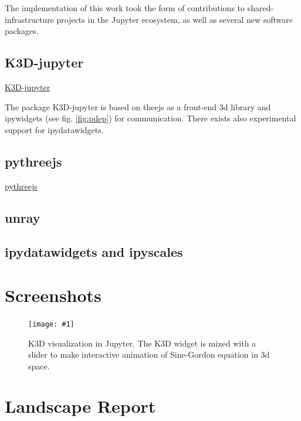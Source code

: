 \documentclass{deliverablereport}
\begin{document}
The implementation of this work took the form of contributions to shared-infrastructure projects in the Jupyter ecosystem, as well as several new software packages.

\subsection{K3D-jupyter}

\href{https://github.com/K3D-tools/K3D-jupyter}{K3D-jupyter}

The package K3D-jupyter is based on theejs as a front-end 3d library
and ipywidgets (see fig. \ref{fig:pdep}) for communication.  There exists also
experimental support for ipydatawidgets. 



\subsection{pythreejs}

\href{https://github.com/jupyter-widgets/pythreejs}{pythreejs}

\subsection{unray}

\subsection{ipydatawidgets and ipyscales}




\appendix
\section{Screenshots}\label{screenshots}

\newcommand{\screenshot}[2]{
\begin{figure}[ht]
  \texttt{[image: \#1]}
  \caption{#2}
\end{figure}}


\screenshot{k3d_3.png}{K3D visualization in Jupyter. The K3D widget is
  mixed with a slider to make interactive animation of Sine-Gordon
  equation in 3d space.}

\clearpage
\section{Landscape Report}\label{landscape}

\end{document}
